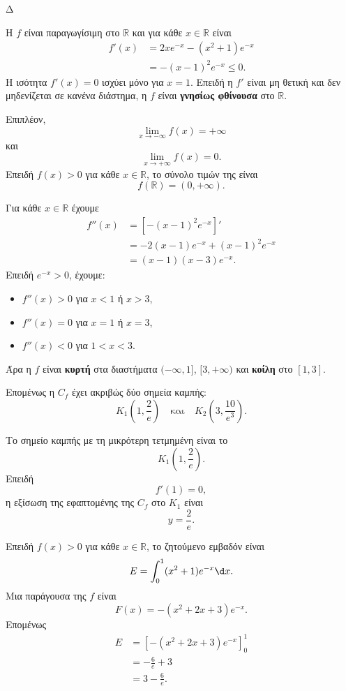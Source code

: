 \begin{thema}{Δ}
\begin{erwthma}
\item Η $f$ είναι παραγωγίσιμη στο $\mathbb{R}$ και για κάθε $x\in\mathbb{R}$ είναι
\begin{align*}
f'(x)
&=2xe^{-x}-(x^2+1)e^{-x}\\
&=-(x-1)^2e^{-x}\leq0.
\end{align*}
Η ισότητα $f'(x)=0$ ισχύει μόνο για $x=1$. Επειδή η $f'$ είναι μη θετική και δεν μηδενίζεται σε κανένα διάστημα, η $f$ είναι \textbf{γνησίως φθίνουσα} στο $\mathbb{R}$.

Επιπλέον,
\[
\lim_{x\to-\infty}f(x)=+\infty
\]
και
\[
\lim_{x\to+\infty}f(x)=0.
\]
Επειδή $f(x)>0$ για κάθε $x\in\mathbb{R}$, το σύνολο τιμών της είναι
\[
{f(\mathbb{R})=(0,+\infty)}.
\]

\item Για κάθε $x\in\mathbb{R}$ έχουμε
\begin{align*}
f''(x)
&=\left[-(x-1)^2e^{-x}\right]'\\
&=-2(x-1)e^{-x}+(x-1)^2e^{-x}\\
&=(x-1)(x-3)e^{-x}.
\end{align*}
Επειδή $e^{-x}>0$, έχουμε:
\begin{itemize}
\item $f''(x)>0$ για $x<1$ ή $x>3$,
\item $f''(x)=0$ για $x=1$ ή $x=3$,
\item $f''(x)<0$ για $1<x<3$.
\end{itemize}
Άρα η $f$ είναι \textbf{κυρτή} στα διαστήματα $(-\infty,1]$, $[3,+\infty)$ και \textbf{κοίλη} στο $[1,3]$.

Επομένως η $C_f$ έχει ακριβώς δύο σημεία καμπής:
\[
{K_1\left(1,\frac{2}{e}\right)}
\quad\text{και}\quad
{K_2\left(3,\frac{10}{e^3}\right)}.
\]

Το σημείο καμπής με τη μικρότερη τετμημένη είναι το
\[
K_1\left(1,\frac{2}{e}\right).
\]
Επειδή
\[
f'(1)=0,
\]
η εξίσωση της εφαπτομένης της $C_f$ στο $K_1$ είναι
\[
{y=\frac{2}{e}}.
\]

\item Επειδή $f(x)>0$ για κάθε $x\in\mathbb{R}$, το ζητούμενο εμβαδόν είναι
\[
E=\int_0^1(x^2+1)e^{-x}\d x.
\]
Μια παράγουσα της $f$ είναι
\[
F(x)=-(x^2+2x+3)e^{-x}.
\]
Επομένως
\begin{align*}
E
&=\left[-(x^2+2x+3)e^{-x}\right]_0^1\\
&=-\frac{6}{e}+3\\
&={3-\frac{6}{e}}.
\end{align*}


\end{erwthma}
\end{thema}
